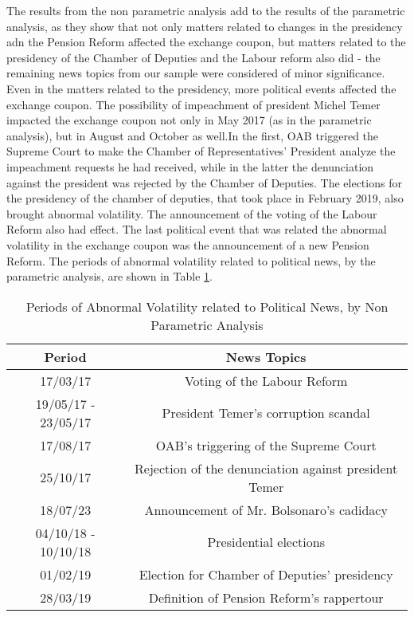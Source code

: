 \documentclass[cic,tc, english]{iiufrgs}
\begin{document}
    The results from the non parametric analysis add to the results of the parametric analysis, as they show that not only matters related to changes in the presidency adn the Pension Reform affected the exchange coupon, but matters related to the presidency of the Chamber of Deputies and the Labour reform also did - the remaining news topics from our sample were considered of minor significance. Even in the matters related to the presidency, more political events affected the exchange coupon. The possibility of impeachment of president Michel Temer impacted the exchange coupon not only in May 2017 (as in the parametric analysis), but in August and October as well.In the first, OAB triggered the Supreme Court to make the Chamber of Representatives' President analyze the impeachment requests he had received, while in the latter the denunciation against the president was rejected by the Chamber of Deputies. The elections for the presidency of the chamber of deputies, that took place in February 2019, also brought abnormal volatility. The announcement of the voting of the Labour Reform also had effect. The last political event that was related the abnormal volatility in the exchange coupon was the announcement of a new Pension Reform. The periods of abnormal volatility related to political news, by the parametric analysis, are shown in Table \ref{tab:resnon}.

    \begin{table}[H]
        \caption{Periods of Abnormal Volatility related to Political News, by Non Parametric Analysis}
        \label{tab:resnon}
        \centering
        \begin{tabular}{| c | c |}
            \hline
            Period & News Topics \\
            \hline \hline
            17/03/17 & Voting of the Labour Reform \\
            \hline
            19/05/17 - 23/05/17 & President Temer's corruption scandal \\
            \hline
            17/08/17 & OAB's triggering of the Supreme Court \\
            \hline
            25/10/17 & Rejection of the denunciation against president Temer \\
            \hline
            18/07/23 & Announcement of Mr. Bolsonaro's cadidacy \\
            \hline
            04/10/18 - 10/10/18 & Presidential elections \\
            \hline
            01/02/19 & Election for Chamber of Deputies' presidency \\
            \hline
            28/03/19 & Definition of Pension Reform's rappertour \\
            \hline
        \end{tabular}
    \end{table}
\end{document}
